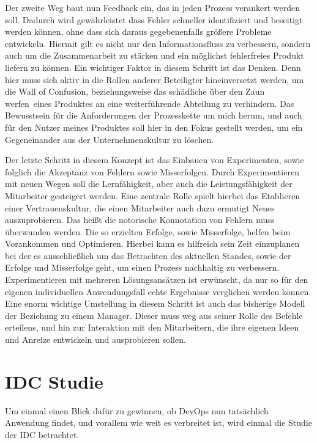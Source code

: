 Der zweite Weg baut nun Feedback ein, das in jeden Prozess verankert werden soll. Dadurch wird gewährleistet dass Fehler schneller identifiziert und beseitigt werden können, ohne dass sich daraus gegebenenfalls größere Probleme entwickeln. Hiermit gilt es nicht nur den Informationsfluss zu verbessern, sondern auch um die Zusammenarbeit zu stärken und ein möglichst fehlerfreies Produkt liefern zu können. Ein wichtiger Faktor in diesem Schritt ist das Denken. Denn hier muss sich aktiv in die Rollen anderer Beteiligter hineinversetzt werden, um die \glqq Wall of Confusion\grqq , beziehungsweise das schädliche \glqq über den Zaun werfen\grqq\ eines Produktes an eine weiterführende Abteilung zu verhindern. Das Bewusstsein für die Anforderungen der Prozesskette um mich herum, und auch für den Nutzer meines Produktes soll hier in den Fokus gestellt werden, um ein Gegeneinander aus der Unternehmenskultur zu löschen.

Der letzte Schritt in diesem Konzept ist das Einbauen von Experimenten, sowie folglich die Akzeptanz von Fehlern sowie Misserfolgen. Durch Experimentieren mit neuen Wegen soll die Lernfähigkeit, aber auch die Leistungsfähigkeit der Mitarbeiter gesteigert werden. Eine zentrale Rolle spielt hierbei das Etablieren einer Vertrauenskultur, die einen Mitarbeiter auch dazu ermutigt Neues auszuprobieren. Das heißt die notorische Konnotation von Fehlern muss überwunden werden. Die so erzielten Erfolge, sowie Misserfolge, helfen beim Vorankommen und Optimieren. Hierbei kann es hilfreich sein Zeit einzuplanen bei der es ausschließlich um das Betrachten des aktuellen Standes, sowie der Erfolge und Misserfolge geht, um einen Prozess nachhaltig zu verbessern. Experimentieren mit mehreren Lösungsansätzen ist erwünscht, da nur so für den eigenen individuellen Anwendungsfall echte Ergebnisse verglichen werden können. Eine enorm wichtige Umstellung in diesem Schritt ist auch das bisherige Modell der Beziehung zu einem Manager. Dieser muss weg aus seiner Rolle des Befehle erteilens, und hin zur Interaktion mit den Mitarbeitern, die ihre eigenen Ideen und Anreize entwickeln und ausprobieren sollen.

\section{IDC Studie \cite{idc:2020}}

Um einmal einen Blick dafür zu gewinnen, ob \ac{DevOps} nun tatsächlich Anwendung findet, und vorallem wie weit es verbreitet ist, wird einmal die Studie der \ac{IDC} betrachtet. 

